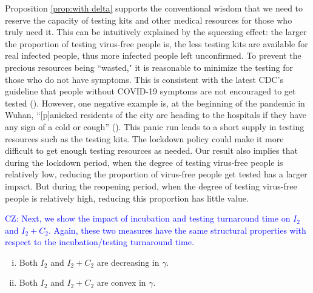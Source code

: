 \documentclass[nonblindrev, copyedit]{informs3a}
\newcommand\nc[1]{\textcolor{red}{NC: #1}}
\newcommand\cz[1]{\textcolor{blue}{CZ: #1}}
\newcounter{prop}[chapter]
\begin{document}
Proposition \ref{prop:with delta} supports the conventional wisdom that we need to reserve the capacity of testing kits and other medical resources for those who truly need it.
This can be intuitively explained by the squeezing effect: the larger the proportion of testing virus-free people is, the less testing kits are available for real infected people, thus more infected people left unconfirmed.
To prevent the precious resources being ``wasted," it is reasonable to minimize the testing for those who do not have symptoms.
This is consistent with the latest CDC's guideline that people without COVID-19 symptoms are not encouraged to get tested (\citealt{Wu2020C.D.C.}). However, one negative example is, at the beginning of the pandemic in Wuhan, ``[p]anicked residents of the city are heading to the hospitals if they have any sign of a cold or cough'' (\citealt{wee2020what}). This panic run leads to a short supply in testing resources such as the testing kits. The lockdown policy could make it more difficult to get enough testing resources as needed.
Our result also implies that during the lockdown period, when the degree of testing virus-free people is relatively low, reducing the proportion of virus-free people get tested has a larger impact. But during the reopening period, when the degree of testing virus-free people is relatively high, reducing this proportion has little value.

\cz{Next, we show the impact of incubation and testing turnaround time on $I_2$ and $I_2+C_2$. Again, these two measures have the same structural properties with respect to the incubation/testing turnaround time.}
\begin{proposition}
\label{prop:with gamma}
    \begin{enumerate}[(i)]
    \item\label{itm:first order with gamma} Both $I_2$ and $I_2+C_2$ are decreasing in $\gamma$.
    \item\label{itm:second order with gamma} Both $I_2$ and $I_2+C_2$ are convex in $\gamma$.
   \end{enumerate}
\end{proposition}
\end{document}
